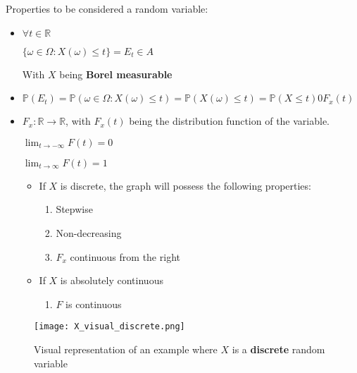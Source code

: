        \noindent
        Properties to be considered a random variable:

            \begin{itemize}
                \item \(\forall t \in \mathbb{R}\)

                    \( \{ \omega \in \Omega : X (\omega) \leq t \} = E_t \in A \)

                    With \(X\) being \textbf{Borel measurable}

                \item 

                    \( \mathbb{P} (E_t) = \mathbb{P} (\omega \in \Omega : X (\omega) \leq t ) = \mathbb{P} (X (\omega) \leq t) = \mathbb{P} (X \leq t)  0 F_x (t)  \)
 
                \item \(F_x : \mathbb{R} \rightarrow \mathbb{R}\), with \(F_x(t)\) being the distribution function of the variable.

                    \( \lim _{t \to - \infty} F(t) = 0 \)    

                    \( \lim _{t\to\infty} F(t) = 1\)

                    \begin{itemize}
                        \item If \(X\) is discrete, the graph will possess the following properties:
                            \begin{enumerate}
                                \item Stepwise
                                \item Non-decreasing 
                                \item \(F_x\) continuous from the right
                            \end{enumerate}
                        \item If \(X\) is \textcolor{dblue}{absolutely} continuous
                            \begin{enumerate}
                                \item \(F\) is continuous
                            \end{enumerate}
                    \end{itemize}
            \end{itemize}

            \begin{figure}[h]
                \centering
                \texttt{[image: X\_visual\_discrete.png]}
                \caption{Visual representation of an example where \(X\) is a \textbf{discrete} random variable}
                \label{fig:X_visual_discrete}
            \end{figure}

